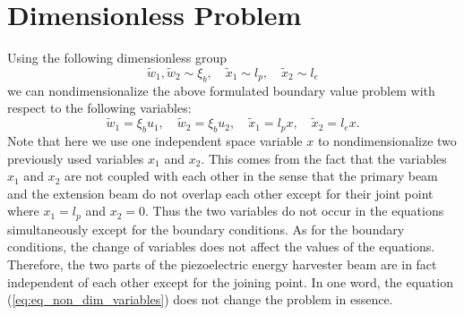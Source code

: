 \documentclass{elsarticle}
\begin{document}
\section{Dimensionless Problem}
Using the following dimensionless group
\begin{equation}
    \tilde{w}_1, \tilde{w}_2 \sim \xi_b,\quad \tilde{x}_1 \sim l_p,\quad \tilde{x}_2 \sim l_e
\end{equation}
we can nondimensionalize the above formulated boundary value problem with respect to the following variables:
\begin{equation}
    \tilde{w}_1 = \xi_b u_1,\quad \tilde{w}_2 = \xi_b u_2,\quad \tilde{x}_1 = l_p x,\quad \tilde{x}_2 = l_e x.
    \label{eq:eq_non_dim_variables}
\end{equation}
Note that here we use one independent space variable $x$ to nondimensionalize two previously used variables $x_1$ and $x_2$. This comes from the fact that the variables $x_1$ and $x_2$ are not coupled with each other in the sense that the primary beam and the extension beam  do not overlap each other except for their joint point where $x_1 = l_p$ and $x_2 = 0$. Thus the two variables do not occur in the equations simultaneously except for the boundary conditions. As for the boundary conditions, the change of variables does not affect the values of the equations. Therefore, the two parts of the piezoelectric energy harvester beam are in fact independent of each other except for the joining point. In one word, the equation (\ref{eq:eq_non_dim_variables}) does not change the problem in essence.
\end{document}
